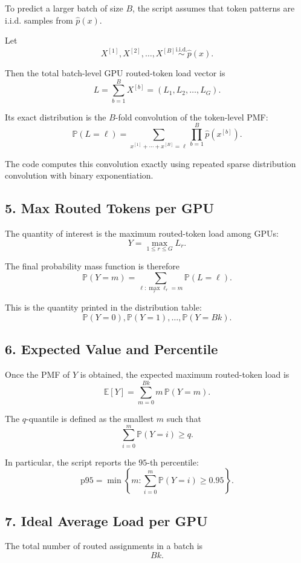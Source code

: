 To predict a larger batch of size \(B\), the script assumes that token patterns
are i.i.d. samples from \(\hat{p}(x)\).

Let
\[
X^{[1]}, X^{[2]}, \dots, X^{[B]} \overset{\text{i.i.d.}}{\sim} \hat{p}(x).
\]

Then the total batch-level GPU routed-token load vector is
\[
L = \sum_{b=1}^{B} X^{[b]}
= (L_1, L_2, \dots, L_G).
\]

Its exact distribution is the \(B\)-fold convolution of the token-level PMF:
\[
\mathbb{P}(L = \ell)
=
\sum_{x^{[1]} + \cdots + x^{[B]} = \ell}
\prod_{b=1}^{B} \hat{p}(x^{[b]}).
\]

The code computes this convolution exactly using repeated sparse distribution
convolution with binary exponentiation.

\subsection*{5. Max Routed Tokens per GPU}

The quantity of interest is the maximum routed-token load among GPUs:
\[
Y = \max_{1 \le r \le G} L_r.
\]

The final probability mass function is therefore
\[
\mathbb{P}(Y = m)
=
\sum_{\ell : \max_r \ell_r = m}
\mathbb{P}(L = \ell).
\]

This is the quantity printed in the distribution table:
\[
\mathbb{P}(Y=0), \mathbb{P}(Y=1), \dots, \mathbb{P}(Y=Bk).
\]

\subsection*{6. Expected Value and Percentile}

Once the PMF of \(Y\) is obtained, the expected maximum routed-token load is
\[
\mathbb{E}[Y]
=
\sum_{m=0}^{Bk} m \, \mathbb{P}(Y=m).
\]

The \(q\)-quantile is defined as the smallest \(m\) such that
\[
\sum_{i=0}^{m} \mathbb{P}(Y=i) \ge q.
\]

In particular, the script reports the \(95\)-th percentile:
\[
\mathrm{p95}
=
\min \left\{
m :
\sum_{i=0}^{m} \mathbb{P}(Y=i) \ge 0.95
\right\}.
\]

\subsection*{7. Ideal Average Load per GPU}

The total number of routed assignments in a batch is
\[
Bk.
\]

